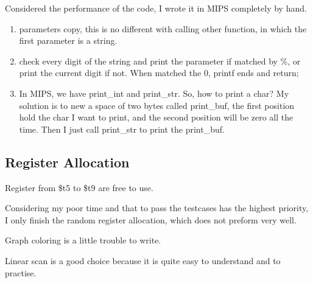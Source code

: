 \documentclass[preprint, 9pt]{sigplanconf}
\begin{document}
    Considered the performance of the code, I wrote it in MIPS completely by hand.
    \begin{enumerate}
        \item parameters copy, this is no different with calling other function, in which the first parameter is a string.
        \item check every digit of the string and print the parameter if matched by \%, or print the current digit if not.
            When matched the 0, printf ends and return;
        \item In MIPS, we have print\_int and print\_str.
            So, how to print a char?
            My solution is to new a space of two bytes called print\_buf, the first position hold the char I want to print, and the second position will be zero all the time.
            Then I just call print\_str to print the print\_buf.
    \end{enumerate}

    \subsection{Register Allocation}

    Register from \$t5 to \$t9 are free to use.

     Considering my poor time and that to pass the testcases has the highest priority, I only finish the random register allocation, which does not preform very well.

    Graph coloring is a little trouble to write.
    
    Linear scan is a good choice because it is quite easy to understand and to practise.
\end{document}
